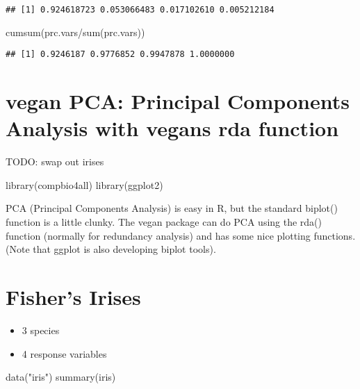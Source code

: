 \documentclass[
]{book}
\newenvironment{Shaded}{\begin{snugshade}}{\end{snugshade}}
\newcommand{\FunctionTok}[1]{\textcolor[rgb]{0.00,0.00,0.00}{#1}}
\newcommand{\NormalTok}[1]{#1}
\newcommand{\SpecialCharTok}[1]{\textcolor[rgb]{0.00,0.00,0.00}{#1}}
\newcommand{\StringTok}[1]{\textcolor[rgb]{0.31,0.60,0.02}{#1}}
\providecommand{\tightlist}{%
  \setlength{\itemsep}{0pt}\setlength{\parskip}{0pt}}
\begin{document}
\begin{verbatim}
## [1] 0.924618723 0.053066483 0.017102610 0.005212184
\end{verbatim}

\begin{Shaded}
\begin{Highlighting}[]
\FunctionTok{cumsum}\NormalTok{(prc.vars}\SpecialCharTok{/}\FunctionTok{sum}\NormalTok{(prc.vars))}
\end{Highlighting}
\end{Shaded}

\begin{verbatim}
## [1] 0.9246187 0.9776852 0.9947878 1.0000000
\end{verbatim}

\hypertarget{vegan-pca-principal-components-analysis-with-vegans-rda-function}{%
\chapter{vegan PCA: Principal Components Analysis with vegans rda function}\label{vegan-pca-principal-components-analysis-with-vegans-rda-function}}

TODO: swap out irises

\begin{Shaded}
\begin{Highlighting}[]
\FunctionTok{library}\NormalTok{(compbio4all)}
\FunctionTok{library}\NormalTok{(ggplot2)}
\end{Highlighting}
\end{Shaded}

PCA (Principal Components Analysis) is easy in R, but the standard biplot() function is a little clunky. The vegan package can do PCA using the rda() function (normally for redundancy analysis) and has some nice plotting functions. (Note that ggplot is also developing biplot tools).

\hypertarget{fishers-irises}{%
\chapter{Fisher's Irises}\label{fishers-irises}}

\begin{itemize}
\tightlist
\item
  3 species
\item
  4 response variables
\end{itemize}

\begin{Shaded}
\begin{Highlighting}[]
\FunctionTok{data}\NormalTok{(}\StringTok{"iris"}\NormalTok{)}
\FunctionTok{summary}\NormalTok{(iris)}
\end{Highlighting}
\end{Shaded}
\end{document}

